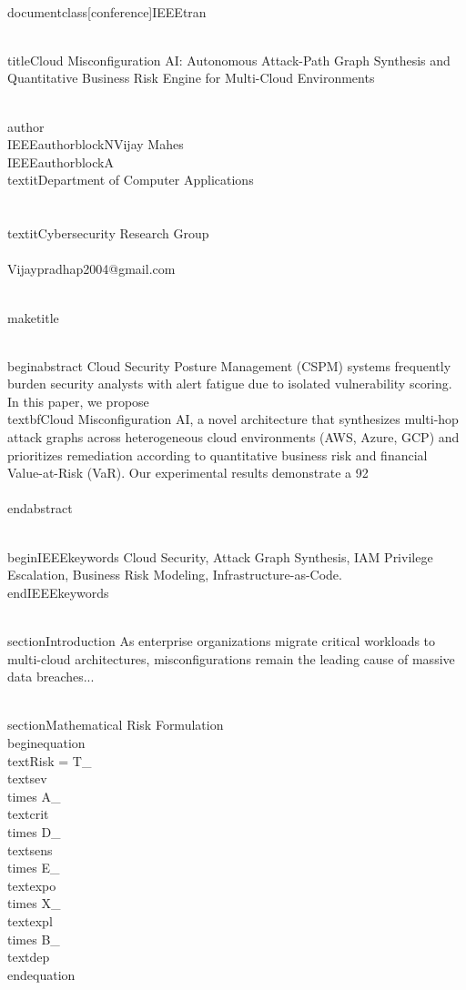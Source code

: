 \\documentclass[conference]{IEEEtran}
\begin{document}
\\title{Cloud Misconfiguration AI: Autonomous Attack-Path Graph Synthesis and Quantitative Business Risk Engine for Multi-Cloud Environments}

\\author{\\IEEEauthorblockN{Vijay Mahes}
\\IEEEauthorblockA{\\textit{Department of Computer Applications} \\\\
\\textit{Cybersecurity Research Group}\\\\
Vijaypradhap2004@gmail.com}
}

\\maketitle

\\begin{abstract}
Cloud Security Posture Management (CSPM) systems frequently burden security analysts with alert fatigue due to isolated vulnerability scoring. In this paper, we propose \\textbf{Cloud Misconfiguration AI}, a novel architecture that synthesizes multi-hop attack graphs across heterogeneous cloud environments (AWS, Azure, GCP) and prioritizes remediation according to quantitative business risk and financial Value-at-Risk (VaR). Our experimental results demonstrate a 92\\%
\\end{abstract}

\\begin{IEEEkeywords}
Cloud Security, Attack Graph Synthesis, IAM Privilege Escalation, Business Risk Modeling, Infrastructure-as-Code.
\\end{IEEEkeywords}

\\section{Introduction}
As enterprise organizations migrate critical workloads to multi-cloud architectures, misconfigurations remain the leading cause of massive data breaches...

\\section{Mathematical Risk Formulation}
\\begin{equation}
\\text{Risk} = T_{\\text{sev}} \\times A_{\\text{crit}} \\times D_{\\text{sens}} \\times E_{\\text{expo}} \\times X_{\\text{expl}} \\times B_{\\text{dep}}
\\end{equation}
\end{document}
